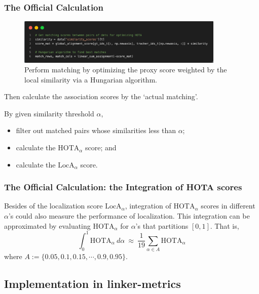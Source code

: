 \documentclass[slidetop, mathserif]{beamer}
\begin{document}
\begin{frame}
	\frametitle{The Official Calculation}
	\begin{figure}
		\includegraphics[width=280pt]{pics/fig11.png}
		\caption{Perform matching by optimizing the proxy score weighted
			by the local similarity via a Hungarian algorithm.}
	\end{figure}

	\vspace{-15pt}

	Then calculate the association scores by the `actual matching'.

	\vspace{3pt}

	By given similarity threshold $\alpha$,
	\begin{itemize}
	\item filter out matched pairs whose similarities less than $\alpha$;
	\item calculate the $\text{HOTA}_\alpha$ score; and
	\item calculate the $\text{LocA}_\alpha$ score.
	\end{itemize}

\end{frame}

\begin{frame}
	\frametitle{The Official Calculation: the Integration of HOTA scores}

	Besides of the localization score $\text{LocA}_\alpha$,
	integration of $\text{HOTA}_\alpha$ scores in different $\alpha$'s
	could also measure the performance of localization.
	This integration can be approximated by evaluating $\text{HOTA}_\alpha$
	for $\alpha$'s that partitions $[0,1]$.
	That is,
	\[
		\int_0^1 \text{HOTA}_\alpha~ d\alpha ~ \approx ~ \dfrac{1}{19}\sum_{\alpha\in A} \text{HOTA}_\alpha
	\]
	where $A:=\{0.05, 0.1, 0.15, \cdots, 0.9, 0.95\}$.

\end{frame}

\subsection{Implementation in linker-metrics}
\end{document}
